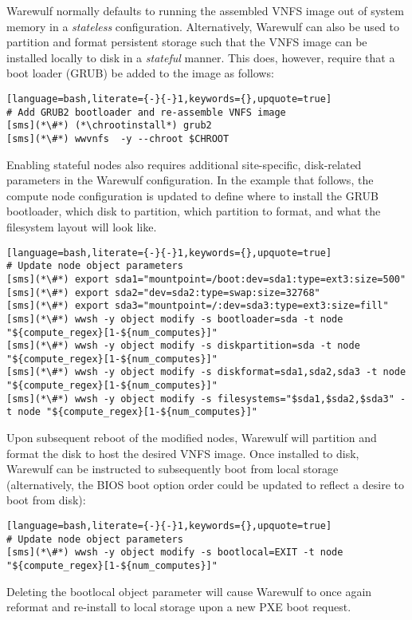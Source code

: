 Warewulf normally defaults to running the assembled VNFS image out of system
memory in a {\em stateless} configuration. Alternatively, Warewulf can also be
used to partition and format persistent storage such that the VNFS image can be
installed locally to disk in a {\em stateful} manner.  This does, however,
require that a boot loader (GRUB) be added to the image as follows:

\begin{lstlisting}[language=bash,literate={-}{-}1,keywords={},upquote=true]
# Add GRUB2 bootloader and re-assemble VNFS image
[sms](*\#*) (*\chrootinstall*) grub2
[sms](*\#*) wwvnfs  -y --chroot $CHROOT
\end{lstlisting}

\noindent Enabling stateful nodes also requires additional site-specific, disk-related
parameters in the Warewulf configuration. In the example that follows, the
compute node configuration is updated to define where to install the GRUB
bootloader, which disk to partition, which partition to format, and what the
filesystem layout will look like.

\begin{lstlisting}[language=bash,literate={-}{-}1,keywords={},upquote=true]
# Update node object parameters
[sms](*\#*) export sda1="mountpoint=/boot:dev=sda1:type=ext3:size=500"
[sms](*\#*) export sda2="dev=sda2:type=swap:size=32768"
[sms](*\#*) export sda3="mountpoint=/:dev=sda3:type=ext3:size=fill"
[sms](*\#*) wwsh -y object modify -s bootloader=sda -t node "${compute_regex}[1-${num_computes}]" 
[sms](*\#*) wwsh -y object modify -s diskpartition=sda -t node "${compute_regex}[1-${num_computes}]" 
[sms](*\#*) wwsh -y object modify -s diskformat=sda1,sda2,sda3 -t node "${compute_regex}[1-${num_computes}]" 
[sms](*\#*) wwsh -y object modify -s filesystems="$sda1,$sda2,$sda3" -t node "${compute_regex}[1-${num_computes}]" 
\end{lstlisting}

\noindent Upon subsequent reboot of the modified nodes, Warewulf will partition
and format the disk to host the desired VNFS image.  Once installed to disk,
Warewulf can be instructed to subsequently boot from local storage
(alternatively, the BIOS boot option order could be updated to reflect a desire
to boot from disk):

\begin{lstlisting}[language=bash,literate={-}{-}1,keywords={},upquote=true]
# Update node object parameters
[sms](*\#*) wwsh -y object modify -s bootlocal=EXIT -t node "${compute_regex}[1-${num_computes}]"
\end{lstlisting}


\noindent Deleting the bootlocal object parameter will cause Warewulf to once
again reformat and re-install to local storage upon a new PXE boot request.
